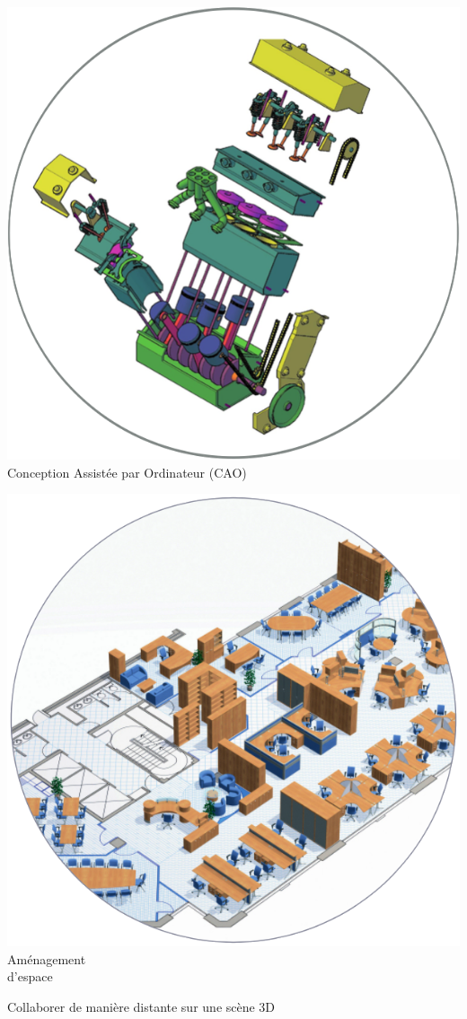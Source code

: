 \begin{frame}{}
{\begin{minipage}{.3\textwidth}
		\includegraphics[width=\textwidth]{img/cad2.png}\\
		Conception Assistée par Ordinateur (CAO)
	\end{minipage}
	\hfill
	\begin{minipage}{.3\textwidth}
		\centering
		\includegraphics[width=\textwidth]{img/spaceplanning2.png}\\
		Aménagement \\ d'espace
	\end{minipage}}
	\vspace*{0.5cm}
	\centering
	
	Collaborer de manière distante sur une scène 3D
\end{frame}

